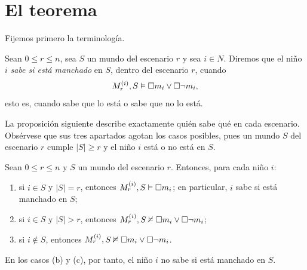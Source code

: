 \section{El teorema}\label{sec:teorema-ninos}

Fijemos primero la terminología.

\begin{definicion}\label{def:sabe}
Sean $0 \le r \le n$, sea $S$ un mundo del escenario $r$ y sea $i \in N$. Diremos que el niño $i$ \emph{sabe si está manchado} en $S$, dentro del escenario $r$, cuando
\[
  M_r^{(i)}, S \vDash \square m_i \lor \square\lnot m_i,
\]
esto es, cuando sabe que lo está o sabe que no lo está.
\end{definicion}

La proposición siguiente describe exactamente quién sabe qué en cada escenario. Obsérvese que sus tres apartados agotan los casos posibles, pues un mundo $S$ del escenario $r$ cumple $|S| \ge r$ y el niño $i$ está o no está en $S$.

\begin{proposicion}\label{prop:rondas}
Sean $0 \le r \le n$ y $S$ un mundo del escenario $r$. Entonces, para cada
niño $i$:
\begin{enumerate}
  \item[(a)] si $i \in S$ y $|S| = r$, entonces $M_r^{(i)}, S \vDash \square m_i$;
    en particular, $i$ sabe si está manchado en $S$;
  \item[(b)] si $i \in S$ y $|S| > r$, entonces
    $M_r^{(i)}, S \nvDash \square m_i \lor \square\lnot m_i$;
  \item[(c)] si $i \notin S$, entonces
    $M_r^{(i)}, S \nvDash \square m_i \lor \square\lnot m_i$.
\end{enumerate}
En los casos (b) y (c), por tanto, el niño $i$ no sabe si está manchado en $S$.
\end{proposicion}

